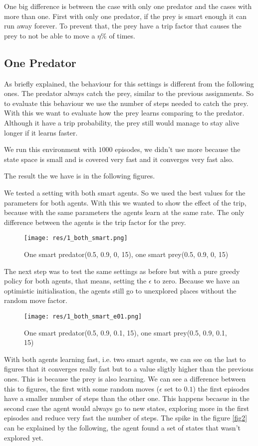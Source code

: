 \documentclass{article}
\begin{document}
One big difference is between the case with only one predator and the cases with
more than one. First with only one predator, if the prey is smart enough it can
run away forever. To prevent that, the prey have a trip factor that causes the
prey to not be able to move a $\eta\%$ of times.

\subsection{One Predator}
As briefly explained, the behaviour for this settings is different from the
following ones. The predator always catch the prey, similar to the previous
assignments. So to evaluate this behaviour we use the number of steps needed to
catch the prey. With this we want to evaluate how the prey learns comparing to
the predator. Although it have a trip probability, the prey still would manage to
stay alive longer if it learns faster.

We run this environment with $1000$ episodes, we didn't use more because the
state space is small and is covered very fast and it converges very fast also.

The result the we have is in the following figures.


We tested a setting with both smart agents. So we used the best
values for the parameters for both agents. With this we wanted to show the effect
of the trip, because with the same parameters the agents learn at the same rate.
The only difference between the agents is the trip factor for the prey.

\begin{figure}[htbp]
    \centering
    \texttt{[image: res/1\_both\_smart.png]}
    \caption{One smart predator(0.5, 0.9, 0, 15), one smart prey(0.5, 0.9, 0, 15)}
    \label{fig:fig2}
\end{figure}


The next step was to test the same settings as before but with a pure greedy
policy for both agents, that means, setting the $\epsilon$ to zero. Because we
have an optimistic initialisation, the agents still go to unexplored places
without the random move factor.

\begin{figure}[htbp]
    \centering
    \texttt{[image: res/1\_both\_smart\_e01.png]}
    \caption{One smart predator(0.5, 0.9, 0.1, 15), one smart prey(0.5, 0.9, 0.1, 15)}
\end{figure}

With both agents learning fast, i.e. two smart agents, we can see on the last to
figures that it converges really fast but to a value sligtly higher than the
previous ones. This is because the prey is also learning.
We can see a difference between this to figures, the first with some random
moves ($\epsilon$ set to $0.1$) the first episodes have a smaller number of
steps than the other one. This happens becasue in the second case the agent
would always go to new states, exploring more in the first episodes and reduce
very fast the number of steps.
The spike in the figure \ref{fig2} can be explained by the following, the agent
found a set of states that wasn't explored yet.
\end{document}
